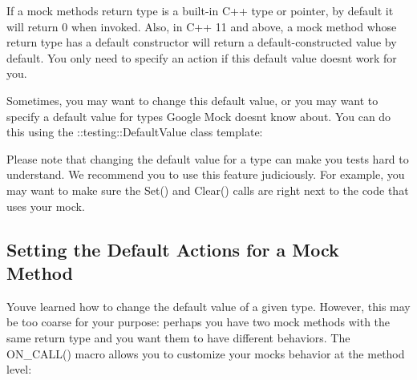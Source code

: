 If a mock method\textquotesingle{}s return type is a built-\/in C++ type or pointer, by default it will return 0 when invoked. Also, in C++ 11 and above, a mock method whose return type has a default constructor will return a default-\/constructed value by default. You only need to specify an action if this default value doesn\textquotesingle{}t work for you.

Sometimes, you may want to change this default value, or you may want to specify a default value for types Google Mock doesn\textquotesingle{}t know about. You can do this using the {\ttfamily \+::testing\+::\+Default\+Value} class template\+:


\begin{DoxyCode}{0}
\DoxyCodeLine{\};}
\DoxyCodeLine{}
\DoxyCodeLine{}
\DoxyCodeLine{}
\DoxyCodeLine{}
\DoxyCodeLine{}
\end{DoxyCode}


Please note that changing the default value for a type can make you tests hard to understand. We recommend you to use this feature judiciously. For example, you may want to make sure the {\ttfamily Set()} and {\ttfamily Clear()} calls are right next to the code that uses your mock.

\subsection*{Setting the Default Actions for a Mock Method}

You\textquotesingle{}ve learned how to change the default value of a given type. However, this may be too coarse for your purpose\+: perhaps you have two mock methods with the same return type and you want them to have different behaviors. The {\ttfamily O\+N\+\_\+\+C\+A\+L\+L()} macro allows you to customize your mock\textquotesingle{}s behavior at the method level\+:


